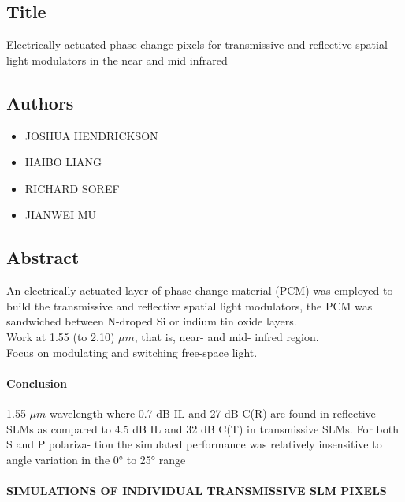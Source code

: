 \documentclass[]{article}
\date{}
\providecommand{\tightlist}{%
  \setlength{\itemsep}{0pt}\setlength{\parskip}{0pt}}
\let\oldparagraph\paragraph
\renewcommand{\paragraph}[1]{\oldparagraph{#1}\mbox{}}
\begin{document}
\subsection{Title}\label{title}

Electrically actuated phase-change pixels for transmissive and
reflective spatial light modulators in the near and mid infrared

\subsection{Authors}\label{authors}

\begin{itemize}
\tightlist
\item
  JOSHUA HENDRICKSON
\item
  HAIBO LIANG
\item
  RICHARD SOREF
\item
  JIANWEI MU
\end{itemize}

\subsection{Abstract}\label{abstract}

An electrically actuated layer of phase-change material (PCM) was
employed to build the transmissive and reflective spatial light
modulators, the PCM was sandwiched between N-droped Si or indium tin
oxide layers.\\
Work at 1.55 (to 2.10) \(\mu m\), that is, near- and mid- infred
region.\\
Focus on modulating and switching free-space light.

\paragraph{Conclusion}\label{conclusion}

1.55 $\mu m$ wavelength where 0.7 dB IL and 27 dB C(R) are found in
reflective SLMs as compared to 4.5 dB IL and 32 dB C(T) in transmissive
SLMs. For both S and P polariza- tion the simulated performance was
relatively insensitive to angle variation in the 0° to 25° range

\paragraph{SIMULATIONS OF INDIVIDUAL TRANSMISSIVE SLM
PIXELS}\label{simulations-of-individual-transmissive-slm-pixels}
\end{document}
